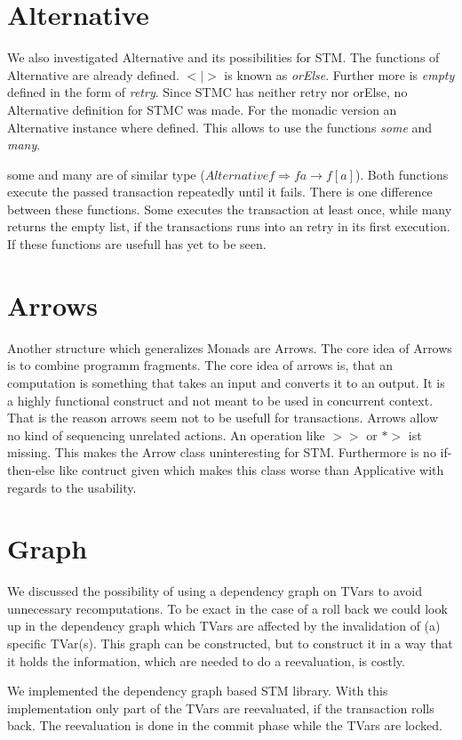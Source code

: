 \documentclass[a4paper,10pt]{article}
\begin{document}
 
\section{Alternative}
We also investigated Alternative and its possibilities for STM. The functions of Alternative are already defined.
$<|>$ is known as \textit{orElse}. Further more is \textit{empty} defined in the form of \textit{retry}. 
Since STMC has neither retry nor orElse, no Alternative definition for STMC was made. For the monadic version 
an Alternative instance where defined. This allows to use the functions \textit{some} and \textit{many}. 

some and many are of similar type ($ Alternative f \Rightarrow f a \rightarrow f [a]$).
Both functions execute the passed transaction repeatedly until it fails. There is one difference between these functions.
Some executes the transaction at least once, while many returns the empty list, if the transactions runs into an retry
in its first execution. If these functions are usefull has yet to be seen.
 
\section{Arrows}
Another structure which generalizes Monads are Arrows. The core idea of Arrows is to combine programm fragments. 
The core idea of arrows is, that an computation is something that takes an input and converts it to an output.
It is a highly functional construct and not meant to be used in concurrent context. That is the reason arrows 
seem not to be usefull for transactions. 
Arrows allow no kind of sequencing unrelated actions. An operation like $>>$ or $*>$ ist missing. This makes the Arrow
class uninteresting for STM. Furthermore is no if-then-else like contruct given which makes this class worse than 
Applicative with regards to the usability.

\section{Graph}
We discussed the possibility of using a dependency graph on TVars to avoid unnecessary recomputations.
To be exact in the case of a roll back we could look up in the dependency graph which TVars are affected by
the invalidation of (a) specific TVar(s). This graph can be constructed, but to construct it in a way that it
holds the information, which are needed to do a reevaluation, is costly. 

We implemented the dependency graph based STM library. With this implementation only part of the TVars are reevaluated,
if the transaction rolls back. The reevaluation is done in the commit phase while the TVars are locked. 
\end{document}
